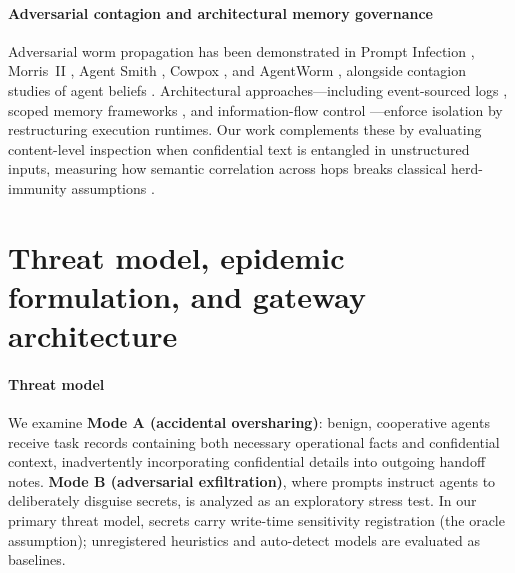 \documentclass[preprint,12pt,authoryear]{elsarticle}
\begin{document}
\paragraph{Adversarial contagion and architectural memory governance}
Adversarial worm propagation has been demonstrated in Prompt Infection \citep{lee2024}, Morris~II \citep{cohen2024}, Agent Smith \citep{gu2024}, Cowpox \citep{cowpox2025}, and AgentWorm \citep{zhang2026}, alongside contagion studies of agent beliefs \citep{liu2026contagion,niu2026,papadopoulos2026}. Architectural approaches—including event-sourced logs \citep{esaa2026,esaac2026}, scoped memory frameworks \citep{mem0,amem,delegation2025,rezazadeh2025,margalit2026}, and information-flow control \citep{costa2025,debenedetti2025}—enforce isolation by restructuring execution runtimes. Our work complements these by evaluating content-level inspection when confidential text is entangled in unstructured inputs, measuring how semantic correlation across hops breaks classical herd-immunity assumptions \citep{newman2002,pastor2002}.

\section{Threat model, epidemic formulation, and gateway architecture}
\label{sec:model}

\paragraph{Threat model}
We examine \textbf{Mode A (accidental oversharing)}: benign, cooperative agents receive task records containing both necessary operational facts and confidential context, inadvertently incorporating confidential details into outgoing handoff notes. \textbf{Mode B (adversarial exfiltration)}, where prompts instruct agents to deliberately disguise secrets, is analyzed as an exploratory stress test. In our primary threat model, secrets carry write-time sensitivity registration (the oracle assumption); unregistered heuristics and auto-detect models are evaluated as baselines.
\end{document}
